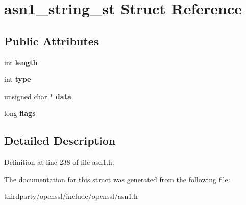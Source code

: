 \hypertarget{structasn1__string__st}{}\section{asn1\+\_\+string\+\_\+st Struct Reference}
\label{structasn1__string__st}
\subsection*{Public Attributes}
\begin{DoxyCompactItemize}
\item 
\mbox{\label{structasn1__string__st_a425b332bd4925320832bb18c59f6a9df}} 
int {\bfseries length}
\item 
\mbox{\label{structasn1__string__st_a4bc5c5a5d5cd42ec6108e8bef50e09ad}} 
int {\bfseries type}
\item 
\mbox{\label{structasn1__string__st_a275a9784693f470debfb2b97411a4fea}} 
unsigned char $\ast$ {\bfseries data}
\item 
\mbox{\label{structasn1__string__st_a166fa78d828cb41bb2499ad411c1774c}} 
long {\bfseries flags}
\end{DoxyCompactItemize}


\subsection{Detailed Description}


Definition at line 238 of file asn1.\+h.



The documentation for this struct was generated from the following file\+:\begin{DoxyCompactItemize}
\item 
thirdparty/openssl/include/openssl/asn1.\+h\end{DoxyCompactItemize}
